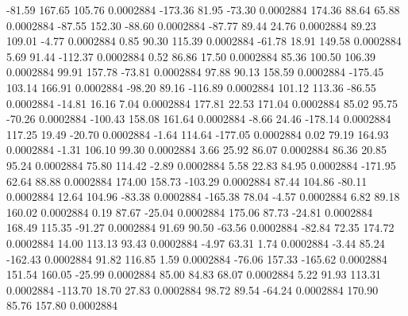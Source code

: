       -81.59      167.65      105.76     0.0002884
     -173.36       81.95      -73.30     0.0002884
      174.36       88.64       65.88     0.0002884
      -87.55      152.30      -88.60     0.0002884
      -87.77       89.44       24.76     0.0002884
       89.23      109.01       -4.77     0.0002884
        0.85       90.30      115.39     0.0002884
      -61.78       18.91      149.58     0.0002884
        5.69       91.44     -112.37     0.0002884
        0.52       86.86       17.50     0.0002884
       85.36      100.50      106.39     0.0002884
       99.91      157.78      -73.81     0.0002884
       97.88       90.13      158.59     0.0002884
     -175.45      103.14      166.91     0.0002884
      -98.20       89.16     -116.89     0.0002884
      101.12      113.36      -86.55     0.0002884
      -14.81       16.16        7.04     0.0002884
      177.81       22.53      171.04     0.0002884
       85.02       95.75      -70.26     0.0002884
     -100.43      158.08      161.64     0.0002884
       -8.66       24.46     -178.14     0.0002884
      117.25       19.49      -20.70     0.0002884
       -1.64      114.64     -177.05     0.0002884
        0.02       79.19      164.93     0.0002884
       -1.31      106.10       99.30     0.0002884
        3.66       25.92       86.07     0.0002884
       86.36       20.85       95.24     0.0002884
       75.80      114.42       -2.89     0.0002884
        5.58       22.83       84.95     0.0002884
     -171.95       62.64       88.88     0.0002884
      174.00      158.73     -103.29     0.0002884
       87.44      104.86      -80.11     0.0002884
       12.64      104.96      -83.38     0.0002884
     -165.38       78.04       -4.57     0.0002884
        6.82       89.18      160.02     0.0002884
        0.19       87.67      -25.04     0.0002884
      175.06       87.73      -24.81     0.0002884
      168.49      115.35      -91.27     0.0002884
       91.69       90.50      -63.56     0.0002884
      -82.84       72.35      174.72     0.0002884
       14.00      113.13       93.43     0.0002884
       -4.97       63.31        1.74     0.0002884
       -3.44       85.24     -162.43     0.0002884
       91.82      116.85        1.59     0.0002884
      -76.06      157.33     -165.62     0.0002884
      151.54      160.05      -25.99     0.0002884
       85.00       84.83       68.07     0.0002884
        5.22       91.93      113.31     0.0002884
     -113.70       18.70       27.83     0.0002884
       98.72       89.54      -64.24     0.0002884
      170.90       85.76      157.80     0.0002884
